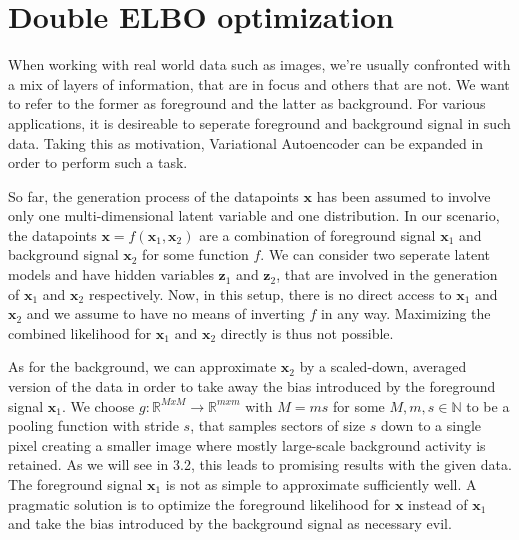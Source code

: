 \documentclass[12pt]{report}
\theoremstyle{definition}
\begin{document}
\section{Double ELBO optimization}
When working with real world data such as images, we're usually confronted with a mix of layers of information, that are in focus and others that are not. We want to refer to the former as foreground and the latter as background. For various applications, it is desireable to seperate foreground and background signal in such data. Taking this as motivation, Variational Autoencoder can be expanded in order to perform such a task.

So far, the generation process of the datapoints $\mathbf{x}$ has been assumed to involve only one multi-dimensional latent variable and one distribution. In our scenario, the datapoints $\mathbf{x} = f(\mathbf{x}_1, \mathbf{x}_2)$ are a combination of foreground signal $\mathbf{x}_1$ and background signal $\mathbf{x}_2$ for some function $f$.
We can consider two seperate latent models and have hidden variables $\mathbf{z}_1$ and $\mathbf{z}_2$, that are involved in the generation of $\mathbf{x}_1$ and $\mathbf{x}_2$ respectively. Now, in this setup, there is no direct access to $\mathbf{x}_1$ and $\mathbf{x}_2$ and we assume to have no means of inverting $f$ in any way. Maximizing the combined likelihood for $\mathbf{x}_1$ and $\mathbf{x}_2$ directly is thus not possible.

As for the background, we can approximate $\mathbf{x}_2$ by a scaled-down, averaged version of the data in order to take away the bias introduced by the foreground signal $\mathbf{x}_1$. We choose $g: \mathbb{R}^{MxM} \rightarrow \mathbb{R}^{mxm}$ with $M=ms$ for some $M, m, s \in \mathbb{N}$ to be a pooling function with stride $s$, that samples sectors of size $s$ down to a single pixel creating a smaller image where mostly large-scale background activity is retained. As we will see in 3.2, this leads to promising results with the given data.
The foreground signal $\mathbf{x}_1$ is not as simple to approximate sufficiently well. A pragmatic solution is to optimize the foreground likelihood for $\mathbf{x}$ instead of $\mathbf{x}_1$ and take the bias introduced by the background signal as necessary evil.
\end{document}
